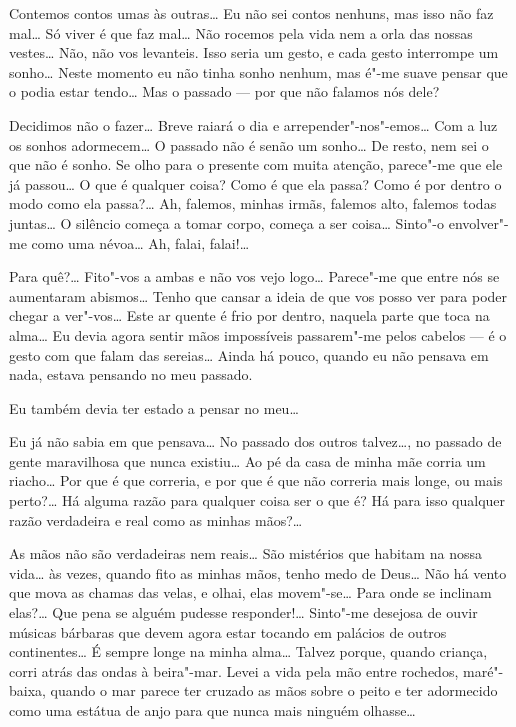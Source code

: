 \hfill{} 

 Contemos contos umas às outras\ldots{}
Eu não sei contos nenhuns,
mas isso não faz mal\ldots{} Só viver
é que faz mal\ldots{} Não rocemos pela vida
nem a orla das nossas vestes\ldots{} Não, não vos
levanteis. Isso seria um gesto, e cada gesto
interrompe um sonho\ldots{} Neste momento eu não tinha
sonho nenhum, mas é"-me suave pensar que o podia
estar tendo\ldots{} Mas o passado --- por que não falamos nós dele?

 Decidimos não o fazer\ldots{}
Breve raiará o dia e
arrepender"-nos"-emos\ldots{} Com a luz os
sonhos adormecem\ldots{} O passado
não é senão um sonho\ldots{} De resto, nem sei o que não é sonho.
Se olho para o presente com muita atenção, parece"-me que ele já
passou\ldots{} O que é qualquer coisa? Como é que ela passa?
Como é por dentro o modo como ela passa?\ldots{}
Ah, falemos, minhas irmãs, falemos			\EP[]
alto, falemos todas juntas\ldots{} 
O silêncio começa a tomar corpo, começa a
ser coisa\ldots{} Sinto"-o envolver"-me
como uma névoa\ldots{} Ah, falai, falai!\ldots{}

 Para quê?\ldots{} Fito"-vos a
ambas e não vos vejo logo\ldots{}
Parece"-me que entre nós se aumentaram abismos\ldots{}
Tenho que cansar a ideia de que vos posso ver para poder
chegar a ver"-vos\ldots{} Este ar quente é frio por dentro,
naquela parte que toca na alma\ldots{} Eu devia
agora sentir mãos impossíveis passarem"-me pelos
cabelos --- é o gesto com que falam das sereias\ldots{} 
Ainda há pouco, quando eu não pensava em nada, estava pensando
no meu passado. 

 Eu também devia ter estado a pensar no meu\ldots{}

 Eu já não sabia em que pensava\ldots{} 
No passado dos outros talvez\ldots{}, no passado de
gente maravilhosa que nunca existiu\ldots{} Ao pé
da casa de minha mãe corria um riacho\ldots{} Por que
é que correria, e por que é que não correria mais longe,
ou mais perto?\ldots{} Há alguma razão
para qualquer coisa ser o que é? Há para isso qualquer
razão verdadeira e real como as minhas mãos?\ldots{}

 As mãos não são verdadeiras nem reais\ldots{}
São mistérios que
habitam na nossa vida\ldots{} às vezes, quando fito 
as minhas mãos, tenho
medo de Deus\ldots{} Não há vento que mova as
chamas das velas, e olhai,
elas movem"-se\ldots{} Para onde se inclinam
elas?\ldots{} Que pena se alguém
pudesse responder!\ldots{} Sinto"-me desejosa
de ouvir músicas bárbaras que
devem agora estar tocando em palácios de
outros continentes\ldots{} É sempre
longe na minha alma\ldots{} Talvez porque,
quando criança, corri atrás das
ondas à beira"-mar. Levei a vida pela mão entre rochedos,
maré"-baixa, quando o mar parece ter cruzado as mãos
sobre o peito e
ter adormecido como uma estátua de anjo para que 
nunca mais ninguém olhasse\ldots{}

